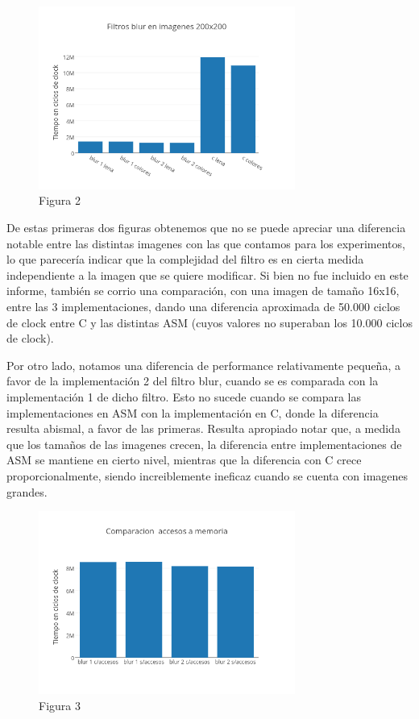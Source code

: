 \documentclass[a4paper]{article}
\begin{document}
\begin{figure}[h]
  \centering
    \includegraphics[width=0.75\textwidth]{imagenes/Filtros blur en imagenes 200x200.png}
  \caption{Figura 2}
  \label{fig:graficoblur2}
\end{figure}
 \FloatBarrier

De estas primeras dos figuras obtenemos que no se puede apreciar una diferencia notable entre las distintas imagenes con las que contamos para los experimentos, lo que parecería indicar que la complejidad del filtro es en cierta medida independiente a la imagen que se quiere modificar. Si bien no fue incluido en este informe, también se corrio una comparación, con una imagen de tamaño 16x16, entre las 3 implementaciones, dando una diferencia aproximada de 50.000 ciclos de clock entre C y las distintas ASM (cuyos valores no superaban los 10.000 ciclos de clock).

Por otro lado, notamos una diferencia de performance relativamente pequeña, a favor de la implementación 2 del filtro blur, cuando se es comparada con la implementación 1 de dicho filtro. Esto no sucede cuando se compara las implementaciones en ASM con la implementación en C, donde la diferencia resulta abismal, a favor de las primeras. Resulta apropiado notar que, a medida que los tamaños de las imagenes crecen, la diferencia entre implementaciones de ASM se mantiene en cierto nivel, mientras que la diferencia con C crece proporcionalmente, siendo increiblemente ineficaz cuando se cuenta con imagenes grandes.

\begin{figure}[h]
  \centering
    \includegraphics[width=0.75\textwidth]{imagenes/ComparacionAccesosAMemoriaBlurColores.png}
  \caption{Figura 3}
  \label{fig:graficoblur3}
\end{figure}
 \FloatBarrier
\end{document}
